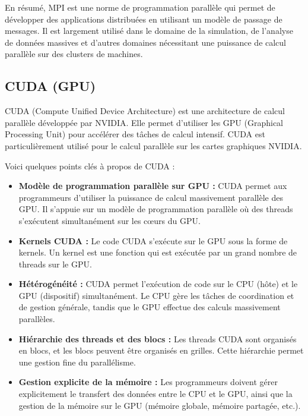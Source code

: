 \documentclass[10pt,a4paper]{article}
\begin{document}
En résumé, MPI est une norme de programmation parallèle qui permet de développer des applications distribuées en utilisant un modèle de passage de messages. Il est largement utilisé dans le domaine de la simulation, de l'analyse de données massives et d'autres domaines nécessitant une puissance de calcul parallèle sur des clusters de machines.


\subsection{CUDA (GPU)}

CUDA (Compute Unified Device Architecture) est une architecture de calcul parallèle développée par NVIDIA. Elle permet d'utiliser les GPU (Graphical Processing Unit) pour accélérer des tâches de calcul intensif. CUDA est particulièrement utilisé pour le calcul parallèle sur les cartes graphiques NVIDIA.

Voici quelques points clés à propos de CUDA :

\begin{itemize}
    
    \item \textbf{Modèle de programmation parallèle sur GPU :} CUDA permet aux programmeurs d'utiliser la puissance de calcul massivement parallèle des GPU. Il s'appuie sur un modèle de programmation parallèle où des threads s'exécutent simultanément sur les cœurs du GPU.
    
    \item \textbf{Kernels CUDA :} Le code CUDA s'exécute sur le GPU sous la forme de kernels. Un kernel est une fonction qui est exécutée par un grand nombre de threads sur le GPU.
    
    \item \textbf{Hétérogénéité :} CUDA permet l'exécution de code sur le CPU (hôte) et le GPU (dispositif) simultanément. Le CPU gère les tâches de coordination et de gestion générale, tandis que le GPU effectue des calculs massivement parallèles.
    
    \item \textbf{Hiérarchie des threads et des blocs :} Les threads CUDA sont organisés en blocs, et les blocs peuvent être organisés en grilles. Cette hiérarchie permet une gestion fine du parallélisme.
    
    \item \textbf{Gestion explicite de la mémoire :} Les programmeurs doivent gérer explicitement le transfert des données entre le CPU et le GPU, ainsi que la gestion de la mémoire sur le GPU (mémoire globale, mémoire partagée, etc.).
\end{itemize}
\end{document}
